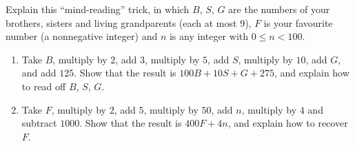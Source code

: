 Explain this ``mind-reading'' trick, in which $B$, $S$, $G$ are the numbers of your brothers, sisters and living grandparents (each at most $9$), $F$ is your favourite number (a nonnegative integer) and $n$ is any integer with $0\le n<100$.
\begin{enumerate}
\item[(a)] Take $B$, multiply by $2$, add $3$, multiply by $5$, add $S$, multiply by $10$, add $G$, and add $125$. Show that the result is $100B+10S+G+275$, and explain how to read off $B$, $S$, $G$.
\item[(b)] Take $F$, multiply by $2$, add $5$, multiply by $50$, add $n$, multiply by $4$ and subtract $1000$. Show that the result is $400F+4n$, and explain how to recover $F$.
\end{enumerate}
